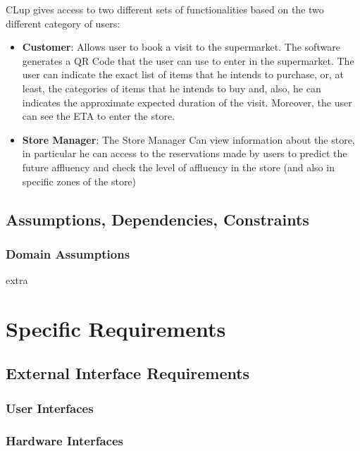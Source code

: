 \documentclass{article}
\begin{document}
	CLup gives access to two different sets of functionalities based on the two different category of users:
	
	\begin{itemize}
		
		\item {\bfseries Customer}: Allows user to book a visit to the supermarket. The software generates a QR Code that the user can use to enter in the supermarket. The user can indicate the exact list of items that he intends to purchase, or, at least, the categories of items that he intends to buy and, also, he can indicates the approximate expected duration of the visit. Moreover, the user can see the ETA to enter the store. \\
		
		\item {\bfseries Store Manager}: The Store Manager Can view information about the store, in particular he can access to the reservations made by users to predict the future affluency and check the level of affluency in the store (and also in specific zones of the store) \\
		
	\end{itemize}

	\subsection{Assumptions, Dependencies, Constraints}
	
		\subsubsection{Domain Assumptions}
		
		extra


\section{Specific Requirements}
	\subsection{External Interface Requirements}
		\subsubsection{User Interfaces}
		\subsubsection{Hardware Interfaces}
\end{document}
